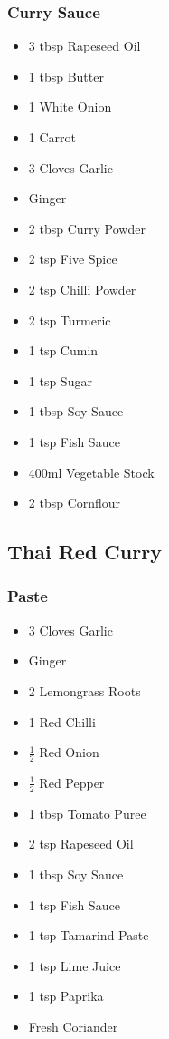 \documentclass[11pt, english]{article}
\begin{document}
		\subsubsection*{Curry Sauce}

	\begin{itemize}
        \setlength\itemsep{0cm}
                \item 3 tbsp Rapeseed Oil
		\item 1 tbsp Butter
		\item 1 White Onion
		\item 1 Carrot
		\item 3 Cloves Garlic
		\item Ginger
		\item 2 tbsp Curry Powder
		\item 2 tsp Five Spice
		\item 2 tsp Chilli Powder
		\item 2 tsp Turmeric
		\item 1 tsp Cumin
		\item 1 tsp Sugar
		\item 1 tbsp Soy Sauce
		\item 1 tsp Fish Sauce
		\item 400ml Vegetable Stock
		\item 2 tbsp Cornflour
        \end{itemize}

\newpage

	\subsection{Thai Red Curry}

		\subsubsection*{Paste}

	\begin{itemize}
        \setlength\itemsep{0cm}
                \item 3 Cloves Garlic
		\item Ginger
		\item 2 Lemongrass Roots
		\item 1 Red Chilli
		\item $\frac{1}{2}$ Red Onion
		\item $\frac{1}{2}$ Red Pepper
		\item 1 tbsp Tomato Puree
		\item 2 tsp Rapeseed Oil
		\item 1 tbsp Soy Sauce
		\item 1 tsp Fish Sauce
		\item 1 tsp Tamarind Paste
		\item 1 tsp Lime Juice
		\item 1 tsp Paprika
		\item Fresh Coriander
        \end{itemize}
\end{document}
